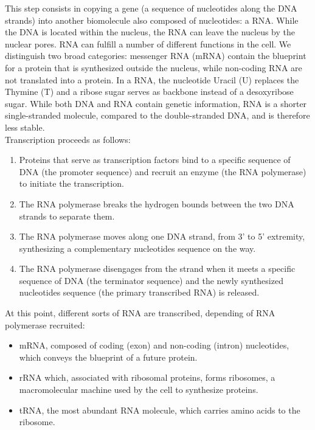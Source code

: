 This step consists in copying a gene (a sequence of nucleotides along the \ac{DNA} strands) into another biomolecule also composed of nucleotides: a \ac{RNA}.
While the \ac{DNA} is located within the nucleus, the \ac{RNA} can leave the nucleus by the nuclear pores. \ac{RNA} can fulfill a number of different functions in the cell. We distinguish two broad categories: messenger \ac{RNA} (mRNA) contain the blueprint for a protein that is synthesized outside the nucleus, while non-coding \ac{RNA} are not translated into a protein.
In a \ac{RNA}, the nucleotide Uracil (U) replaces the Thymine (T) and a ribose sugar serves as backbone instead of a desoxyribose sugar.
While both \ac{DNA} and \ac{RNA} contain genetic information, \ac{RNA} is a shorter single-stranded molecule, compared to the double-stranded \ac{DNA}, and is therefore less stable.
\\

\noindent
Transcription proceeds as follows:
\begin{enumerate}
	\setlength\itemsep{0.1em}
	\item Proteins that serve as transcription factors bind to a specific sequence of \ac{DNA} (the promoter sequence) and recruit an enzyme (the \ac{RNA} polymerase) to initiate the transcription.
	\item The \ac{RNA} polymerase breaks the hydrogen bounds between the two \ac{DNA} strands to separate them.
	\item The \ac{RNA} polymerase moves along one \ac{DNA} strand, from 3' to 5' extremity, synthesizing a complementary nucleotides sequence on the way.
	\item The \ac{RNA} polymerase disengages from the strand when it meets a specific sequence of \ac{DNA} (the terminator sequence) and the newly synthesized nucleotides sequence (the primary transcribed \ac{RNA}) is released.
\end{enumerate}

\noindent
At this point, different sorts of \ac{RNA} are transcribed, depending of \ac{RNA} polymerase recruited:
\begin{itemize}
	\setlength\itemsep{0.1em}
	\item \ac{mRNA}, composed of coding (exon) and non-coding (intron) nucleotides, which conveys the blueprint of a future protein.
	\item \ac{rRNA} which, associated with ribosomal proteins, forms ribosomes, a macromolecular machine used by the cell to synthesize proteins.
	\item \ac{tRNA}, the most abundant \ac{RNA} molecule, which carries amino acids to the ribosome.
\end{itemize}

